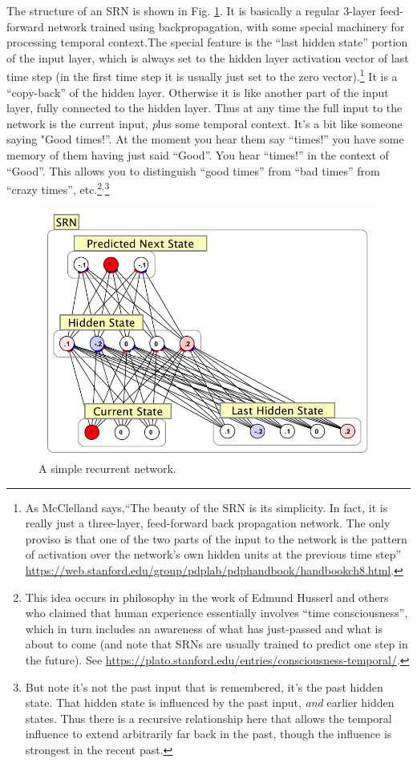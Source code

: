 The structure of an SRN is shown in Fig. \ref{SRN_Structure}. It is basically a regular 3-layer feed-forward network trained using backpropagation, with some special machinery for processing temporal context.The special feature is the ``last hidden state'' portion of the input layer, which is always set to the hidden layer activation vector of last time step (in the first time step it is usually just set to the  zero vector).\footnote{ As McClelland says,``The beauty of the SRN is its simplicity. In fact, it is really just a three-layer, feed-forward back propagation network. The only proviso is that one of the two parts of the input to the network is the pattern of activation over the network's own hidden units at the previous time step'' \url{ https://web.stanford.edu/group/pdplab/pdphandbook/handbookch8.html}.} It is a ``copy-back'' of the hidden  layer. Otherwise it is like another part of the input layer, fully connected to the hidden layer. Thus at any time the full input to the network is the current input, {\emph plus some temporal context}. It's a bit like  someone saying "Good times!''. At the moment you hear them say ``times!'' you have some memory of them having just said ``Good''. You  hear ``times!'' in the context of ``Good''. This allows you to distinguish ``good times'' from ``bad times'' from ``crazy times'', etc.\footnote{This idea occurs in philosophy in the work of Edmund Husserl and others who claimed that human experience essentially involves ``time consciousness'', which in turn includes an awareness of what has just-passed and what is about to come (and note that SRNs are usually trained to predict one step in the future). See \url{https://plato.stanford.edu/entries/consciousness-temporal/}.}$^,$\footnote{But note it's not the past input that is remembered, it's the past  hidden state. That hidden state is influenced by the past  input, \emph{and} earlier hidden states. Thus there is a recursive relationship here that allows the temporal influence to extend arbitrarily far back in the past, though the influence is strongest in the recent past.}

\begin{figure}[h]
\centering
\includegraphics[scale=.6]{./images/srn.png}
\caption[Simbrain screenshot.]{A simple recurrent network.}
\label{SRN_Structure}
\end{figure}

